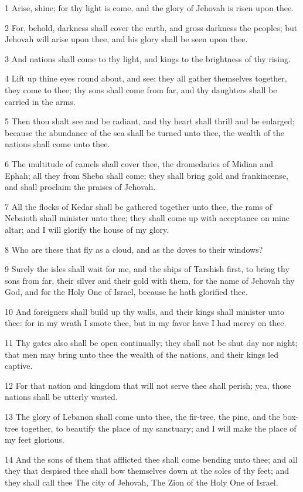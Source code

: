 \par 1 Arise, shine; for thy light is come, and the glory of Jehovah is risen upon thee.
\par 2 For, behold, darkness shall cover the earth, and gross darkness the peoples; but Jehovah will arise upon thee, and his glory shall be seen upon thee.
\par 3 And nations shall come to thy light, and kings to the brightness of thy rising.
\par 4 Lift up thine eyes round about, and see: they all gather themselves together, they come to thee; thy sons shall come from far, and thy daughters shall be carried in the arms.
\par 5 Then thou shalt see and be radiant, and thy heart shall thrill and be enlarged; because the abundance of the sea shall be turned unto thee, the wealth of the nations shall come unto thee.
\par 6 The multitude of camels shall cover thee, the dromedaries of Midian and Ephah; all they from Sheba shall come; they shall bring gold and frankincense, and shall proclaim the praises of Jehovah.
\par 7 All the flocks of Kedar shall be gathered together unto thee, the rams of Nebaioth shall minister unto thee; they shall come up with acceptance on mine altar; and I will glorify the house of my glory.
\par 8 Who are these that fly as a cloud, and as the doves to their windows?
\par 9 Surely the isles shall wait for me, and the ships of Tarshish first, to bring thy sons from far, their silver and their gold with them, for the name of Jehovah thy God, and for the Holy One of Israel, because he hath glorified thee.
\par 10 And foreigners shall build up thy walls, and their kings shall minister unto thee: for in my wrath I smote thee, but in my favor have I had mercy on thee.
\par 11 Thy gates also shall be open continually; they shall not be shut day nor night; that men may bring unto thee the wealth of the nations, and their kings led captive.
\par 12 For that nation and kingdom that will not serve thee shall perish; yea, those nations shall be utterly wasted.
\par 13 The glory of Lebanon shall come unto thee, the fir-tree, the pine, and the box-tree together, to beautify the place of my sanctuary; and I will make the place of my feet glorious.
\par 14 And the sons of them that afflicted thee shall come bending unto thee; and all they that despised thee shall bow themselves down at the soles of thy feet; and they shall call thee The city of Jehovah, The Zion of the Holy One of Israel.
